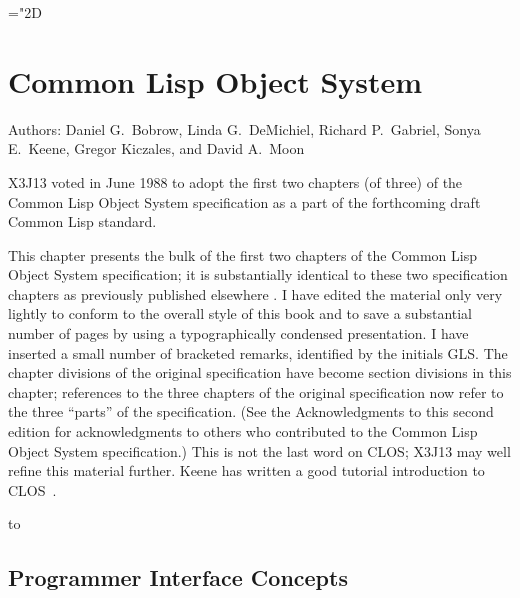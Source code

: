 
\clearpage\def\pagestatus{FINAL PROOF}



\ifx \rulang\Undef
  \def\CLOS{Common Lisp Object System}
  \def\OS{Object System}
\else %
  \def\CLOS{Объектная система Common Lisp'а}
  \def\OS{Объектная система}
\fi

\def\sub{_}

\mathchardef\mhyphen="2D

\chapter{Common Lisp Object System}
\label{CLOS}

Authors: Daniel G.~Bobrow, Linda G.~DeMichiel,
Richard P.~Gabriel, Sonya E.~Keene, Gregor Kiczales,
and David A.~Moon

\begin{new}
X3J13 voted in June 1988
to adopt the first two chapters (of three) of the
Common Lisp Object System specification
as a part of the forthcoming draft Common Lisp standard.
\end{new}

This chapter presents the bulk of the first two chapters of the
Common Lisp Object System specification; it is substantially
identical to these two specification chapters as previously published elsewhere
\cite{SIGPLAN-CLOS,LASC-CLOS-PART-1,LASC-CLOS-PART-2}.
I have edited the material only very lightly
to conform to the overall style of this book and to save a substantial
number of pages by using a typographically condensed presentation.
I have inserted a small
number of bracketed remarks, identified by the initials GLS.
The chapter divisions of the original specification have become
section divisions in this chapter; references to the three chapters
of the original specification now refer to the three ``parts'' of the
specification.
(See the Acknowledgments to this second edition for
acknowledgments to others who contributed to the Common Lisp Object System specification.)
This is not the last word on CLOS;
X3J13 may well refine this material further.
Keene has written a good tutorial introduction to CLOS~\cite{KEENE}.

\noindent\hbox to \textwidth{\hss---Guy L. Steele Jr.}

\section{Programmer Interface Concepts}

